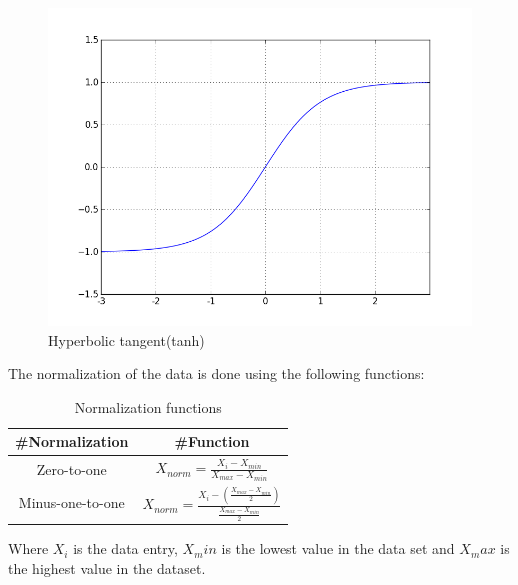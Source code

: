 \begin{figure}[H]
\centering
\includegraphics[width=0.8\linewidth,natwidth=898,natheight=587]{billeder/activationFunctions/tanh.png}
\caption{Hyperbolic tangent(tanh)}
\label{fig:Tanh}
\end{figure}

The normalization of the data is done using the following functions:
\begin{table}[H]
\centering  %
\renewcommand{\arraystretch}{2}
\begin{tabular}{c c} %
 \#Normalization & \#Function \\ [0.5ex] %
\hline                  %
Zero-to-one & $ X_{norm} = \frac{X_i - X_{min}}{X_{max} - X_{min}}$ \\
Minus-one-to-one & $ X_{norm} = \frac{X_i - (\frac{X_{max} - X_{min}}{2})}{\frac{X_{max} - X_{min}}{2}}$ \\
[1ex]
\hline %
\end{tabular}
\caption{Normalization functions} %
\label{table:naiveTrainingApproach} %
\end{table}
Where $X_i$ is the data entry, $X_min$ is the lowest value in the data set and $X_max$ is the highest value in the dataset.

